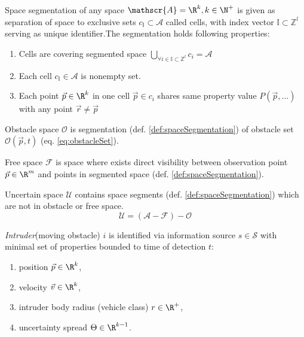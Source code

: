     \begin{definition}{Space segmentation}\label{def:spaceSegmentation} of any space $\mathscr{A}=\R^k, k\in\N^+$ is given as separation of space to exclusive sets $c_\mathbb{I}\subset\mathscr{A}$ called cells, with index vector $\mathbb{I}\subset\mathbb{Z}^l$ serving as unique identifier.The segmentation holds following properties:
    \begin{enumerate}
        \item Cells are covering segmented space $\bigcup_{\forall i\in \mathbb{I}\subset\mathbb{Z}^l} c_i = \mathscr{A}$
        \item Each cell $c_\mathbb{I}\in\mathscr{A}$ is nonempty set.
        \item Each point $\vec{p}\in\R^k$ in one cell $\vec{p}\in c_i$ shares same property value $P(\vec{p},\dots)$ with any point $\vec{r}\neq\vec{p}$ 
    \end{enumerate}
    
    \end{definition}
    
    \begin{definition}{Obstacle space $\mathscr{O}$} is segmentation (def. \ref{def:spaceSegmentation}) of obstacle set $\mathscr{O}(\vec{p},t)$ (eq. \ref{eq:obstacleSet}).
    \end{definition}
    
    \begin{definition}{Free space $\mathscr{F}$} is space where exists direct visibility between observation point $\vec{p}\in\R^m$ and points in segmented space (def. \ref{def:spaceSegmentation}).
    \end{definition}
    
    \begin{definition}{Uncertain space $\mathscr{U}$} contains space segments (def. \ref{def:spaceSegmentation}) which are not in obstacle or free space.
    \begin{equation}
        \mathscr{U}=(\mathscr{A}-\mathscr{F})-\mathscr{O}
    \end{equation}
    \end{definition}
    
    \begin{definition}{\emph{Intruder}(moving obstacle) $i$} is identified via information source $s\in\mathscr{S}$ with minimal set of properties bounded to time of detection $t$:
    \begin{enumerate}
        \item position $\vec{p}\in\R^k$,
        \item velocity $\vec{v}\in\R^k$,
        \item intruder body radius (vehicle class) $r\in\R^+$,
        \item uncertainty spread $\Theta\in\R^{k-1}$.
    \end{enumerate}
    
    \end{definition}

